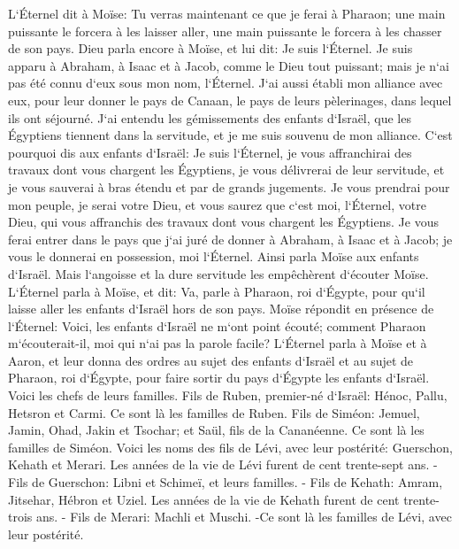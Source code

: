 \verse L`Éternel dit à Moïse: Tu verras maintenant ce que je ferai à Pharaon; une main puissante le forcera à les laisser aller, une main puissante le forcera à les chasser de son pays. 
\verse Dieu parla encore à Moïse, et lui dit: Je suis l`Éternel. 
\verse Je suis apparu à Abraham, à Isaac et à Jacob, comme le Dieu tout puissant; mais je n`ai pas été connu d`eux sous mon nom, l`Éternel. 
\verse J`ai aussi établi mon alliance avec eux, pour leur donner le pays de Canaan, le pays de leurs pèlerinages, dans lequel ils ont séjourné. 
\verse J`ai entendu les gémissements des enfants d`Israël, que les Égyptiens tiennent dans la servitude, et je me suis souvenu de mon alliance. 
\verse C`est pourquoi dis aux enfants d`Israël: Je suis l`Éternel, je vous affranchirai des travaux dont vous chargent les Égyptiens, je vous délivrerai de leur servitude, et je vous sauverai à bras étendu et par de grands jugements. 
\verse Je vous prendrai pour mon peuple, je serai votre Dieu, et vous saurez que c`est moi, l`Éternel, votre Dieu, qui vous affranchis des travaux dont vous chargent les Égyptiens. 
\verse Je vous ferai entrer dans le pays que j`ai juré de donner à Abraham, à Isaac et à Jacob; je vous le donnerai en possession, moi l`Éternel. 
\verse Ainsi parla Moïse aux enfants d`Israël. Mais l`angoisse et la dure servitude les empêchèrent d`écouter Moïse. 
\verse L`Éternel parla à Moïse, et dit: 
\verse Va, parle à Pharaon, roi d`Égypte, pour qu`il laisse aller les enfants d`Israël hors de son pays. 
\verse Moïse répondit en présence de l`Éternel: Voici, les enfants d`Israël ne m`ont point écouté; comment Pharaon m`écouterait-il, moi qui n`ai pas la parole facile? 
\verse L`Éternel parla à Moïse et à Aaron, et leur donna des ordres au sujet des enfants d`Israël et au sujet de Pharaon, roi d`Égypte, pour faire sortir du pays d`Égypte les enfants d`Israël. 
\verse Voici les chefs de leurs familles. Fils de Ruben, premier-né d`Israël: Hénoc, Pallu, Hetsron et Carmi. Ce sont là les familles de Ruben. 
\verse Fils de Siméon: Jemuel, Jamin, Ohad, Jakin et Tsochar; et Saül, fils de la Cananéenne. Ce sont là les familles de Siméon. 
\verse Voici les noms des fils de Lévi, avec leur postérité: Guerschon, Kehath et Merari. Les années de la vie de Lévi furent de cent trente-sept ans. - 
\verse Fils de Guerschon: Libni et Schimeï, et leurs familles. - 
\verse Fils de Kehath: Amram, Jitsehar, Hébron et Uziel. Les années de la vie de Kehath furent de cent trente-trois ans. - 
\verse Fils de Merari: Machli et Muschi. -Ce sont là les familles de Lévi, avec leur postérité. 
